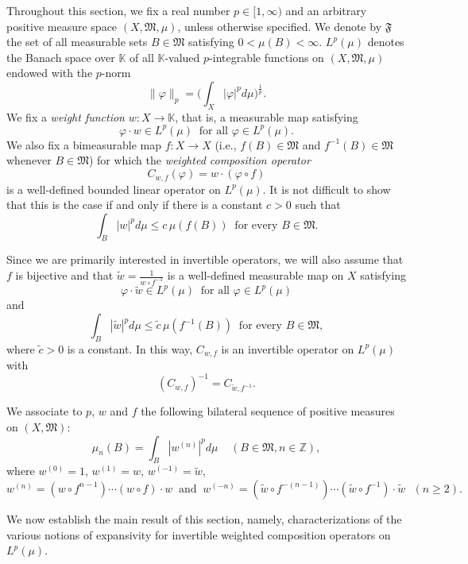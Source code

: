 \documentclass[12pt]{article}
\theoremstyle{plain}
\theoremstyle{definition}
\newcommand{\Z}{\mathbb{Z}} %
\newcommand{\K}{\mathbb{K}} %
\newcommand{\fF}{\mathfrak{F}}
\newcommand{\fM}{\mathfrak{M}}
\newcommand{\wt}{\widetilde}
\begin{document}
Throughout this section, we fix a real number $p \in [1,\infty)$ and an arbitrary positive measure space $(X,\fM,\mu)$,
unless otherwise specified. We denote by $\fF$ the set of all measurable sets $B \in \fM$ satisfying $0 < \mu(B) < \infty$.
$L^p(\mu)$ denotes the Banach space over $\K$ of all $\K$-valued $p$-integrable functions on $(X,\fM,\mu)$ 
endowed with the $p$-norm
\[
\|\varphi\|_p = \Big(\int_X |\varphi|^p d\mu\Big)^{\frac{1}{p}}.
\]
We fix a {\em weight function} $w : X \to \K$, that is, a measurable map satisfying
\[ 
\varphi \cdot w \in L^p(\mu) \ \text{ for all } \varphi \in L^p(\mu).
\]
We also fix a bimeasurable map $f : X \to X$ (i.e., $f(B) \in \fM$ and $f^{-1}(B) \in \fM$ whenever $B \in \fM$)
for which the {\em weighted composition operator}
\[
C_{w,f}(\varphi) = w \cdot (\varphi \circ f)
\]
is a well-defined bounded linear operator on $L^p(\mu)$. 
It is not difficult to show that this is the case if and only if there is a constant $c > 0$ such that
\[ 
\int_B |w|^p d\mu \leq c\, \mu(f(B)) \ \text{ for every } B \in \fM.
\]

Since we are primarily interested in invertible operators, we will also assume that $f$ is bijective and that $\wt{w} = \frac{1}{w \circ f^{-1}}$
is a well-defined measurable map on $X$ satisfying
\[ 
\varphi \cdot \wt{w} \in L^p(\mu) \ \text{ for all } \varphi \in L^p(\mu)
\]
and
\[
\int_B |\wt{w}|^p d\mu \leq \tilde{c}\, \mu(f^{-1}(B)) \ \text{ for every } B \in \fM,
\]
where $\tilde{c} > 0$ is a constant. In this way, $C_{w,f}$ is an invertible operator on $L^p(\mu)$ with 
\[
(C_{w,f})^{-1} = C_{\wt{w},f^{-1}}.
\]

We associate to $p$, $w$ and $f$ the following bilateral sequence of positive measures on $(X,\fM)$:
\[
\mu_n(B) = \int_B |w^{(n)}|^p d\mu \ \ \ \ \ (B \in \fM, n \in \Z),
\]
where $w^{(0)} = 1$, $w^{(1)} = w$, $w^{(-1)} = \wt{w}$,
\[
w^{(n)} = (w \circ f^{n-1}) \cdots (w \circ f) \cdot w \ \text{ and } \ 
w^{(-n)} = (\wt{w} \circ f^{-(n-1)}) \cdots (\wt{w} \circ f^{-1}) \cdot \wt{w} \ \ \ (n \geq 2).
\]

We now establish the main result of this section, namely,
characterizations of the various notions of expansivity for invertible weighted composition operators on $L^p(\mu)$.
\end{document}
